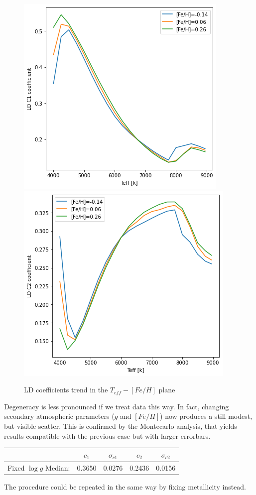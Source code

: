 \documentclass{aa}
\begin{document}
\begin{figure}[h!]
    \centering  
    \includegraphics[scale=0.4, angle=0]{pictures/double_c1}
    \includegraphics[scale=0.4, angle=0]{pictures/double_c2}
    \caption{LD coefficients trend in the $T_{eff}-[Fe/H]$ plane}
\end{figure}
Degeneracy is less pronounced if we treat data this way. In fact, changing 
secondary atmospheric parameters ($g$ and $[Fe/H]$) now produces a still 
modest, but visible scatter. This is confirmed by the Montecarlo analysis, 
that yields results compatible with the previous case but with larger errorbars.
\begin{table}[h!]
	\centering
	\begin{tabular}{ccccc}
		\hline
		& $c_1$ & $\sigma_{c1}$ & $c_2$ & $\sigma_{c2}$\\
		\hline
		Fixed $\log{g}$ Median: & 0.3650 & 0.0276 & 0.2436 & 0.0156 \\
		\hline
	\end{tabular} 
\end{table}
The procedure could be repeated in the same way by fixing metallicity instead.
\end{document}
